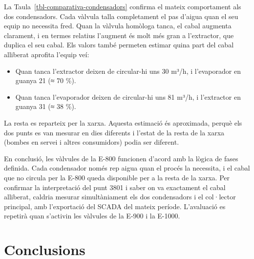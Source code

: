\documentclass[
  paper=a4,
  oneside  ,captions=tableheading
]{scrartcl}
\providecommand{\tightlist}{%
  \setlength{\itemsep}{0pt}\setlength{\parskip}{0pt}}
\begin{document}
La Taula~\ref{tbl-comparativa-condensadors} confirma el mateix
comportament als dos condensadors. Cada vàlvula talla completament el
pas d'aigua quan el seu equip no necessita fred. Quan la vàlvula
homòloga tanca, el cabal augmenta clarament, i en termes relatius
l'augment és molt més gran a l'extractor, que duplica el seu cabal. Els
valors també permeten estimar quina part del cabal alliberat aprofita
l'equip veí:

\begin{itemize}
\tightlist
\item
  Quan tanca l'extractor deixen de circular-hi uns 30 m³/h, i
  l'evaporador en guanya 21 (≈ 70 \%).
\item
  Quan tanca l'evaporador deixen de circular-hi uns 81 m³/h, i
  l'extractor en guanya 31 (≈ 38 \%).
\end{itemize}

La resta es reparteix per la xarxa. Aquesta estimació és aproximada,
perquè els dos punts es van mesurar en dies diferents i l'estat de la
resta de la xarxa (bombes en servei i altres consumidors) podia ser
diferent.

En conclusió, les vàlvules de la E-800 funcionen d'acord amb la lògica
de fases definida. Cada condensador només rep aigua quan el procés la
necessita, i el cabal que no circula per la E-800 queda disponible per a
la resta de la xarxa. Per confirmar la interpretació del punt 3801 i
saber on va exactament el cabal alliberat, caldria mesurar
simultàniament els dos condensadors i el col·lector principal, amb
l'exportació del SCADA del mateix període. L'avaluació es repetirà quan
s'activin les vàlvules de la E-900 i la E-1000.

\section{Conclusions}\label{conclusions}
\end{document}
